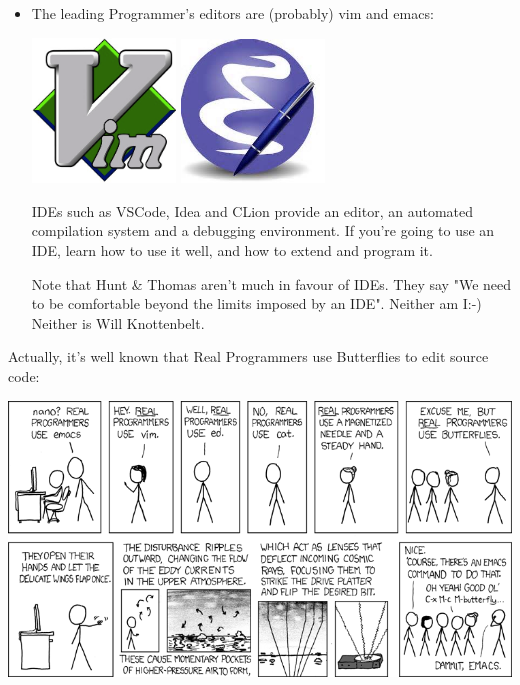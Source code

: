 \documentclass[aspectratio=169]{beamer}
\begin{document}
\begin{frame}
  \begin{itemize}
    \item
       The leading Programmer's editors are (probably) \alert{vim} and \alert{emacs}:

\includegraphics[width=0.3\textwidth]{vimLogo}
\includegraphics[width=0.3\textwidth]{emacsLogo}

    \pitem IDEs such as \alert{VSCode}, \alert{Idea} and \alert{CLion}
          provide an editor, an automated compilation system
	  and a debugging environment.
	  If you're going to use an IDE,
          learn how to use it well, and
          how to extend and program it.

     \pitem
     Note that \alert{Hunt \& Thomas} aren't much in favour of IDEs.
     They say "We need to be comfortable beyond the limits imposed by an IDE".
     Neither am I:-)  Neither is Will Knottenbelt.
  \end{itemize}
\end{frame}

\begin{frame}
Actually, it's well known that \alert{Real Programmers use Butterflies}
to edit source code:

\centering
\vspace{10pt}
\includegraphics[height=0.8\textheight]{real_programmers.png}

\end{frame}
\end{document}
